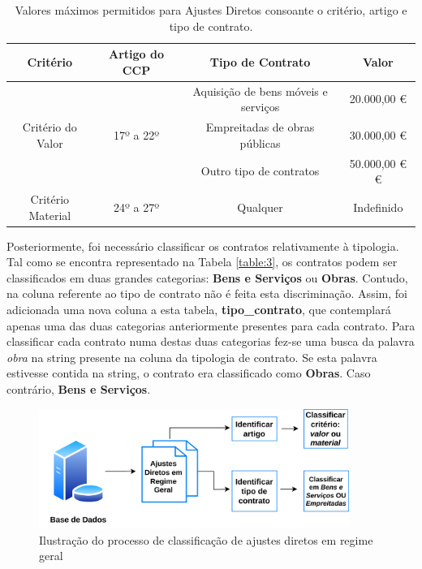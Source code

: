  \begin{table}[H]
 	\centering
 	\begin{tabular}{|c|c|c|c|}
 		\hline
 		\textbf{Critério}                  & \textbf{Artigo do CCP}           & \textbf{Tipo de Contrato}           & \textbf{Valor} \\ \hline
 		\multirow{3}{*}{Critério do Valor} & \multirow{3}{*}{17º a 22º} & Aquisição de bens móveis e serviços & 20.000,00 €         \\ \cline{3-4} 
 		&                            & Empreitadas de obras públicas       & 30.000,00 €        \\ \cline{3-4} 
 		&                            & Outro tipo de contratos             & 50.000,00 € €        \\ \hline
 		Critério Material                  & 24º a 27º                  & Qualquer                            & Indefinido     \\ \hline
 	\end{tabular}
 	\caption{Valores máximos permitidos para Ajustes Diretos consoante o critério, artigo e tipo de contrato.}
 \end{table}

Posteriormente, foi necessário classificar os contratos relativamente à tipologia. Tal como se encontra representado na Tabela \ref{table:3}, os contratos podem ser classificados em duas grandes categorias: \textbf{Bens e Serviços} ou \textbf{Obras}. Contudo, na coluna referente ao tipo de contrato não é feita esta discriminação. Assim, foi adicionada uma nova coluna a esta tabela, \textbf{tipo\_contrato}, que contemplará apenas uma das duas categorias anteriormente presentes para cada contrato. Para classificar cada contrato numa destas duas categorias fez-se uma busca da palavra \textit{obra} na string presente na coluna da tipologia de contrato. Se esta palavra estivesse contida na string, o contrato era classificado como \textbf{Obras}. Caso contrário, \textbf{Bens e Serviços}. 

\begin{figure}[H]
	\centering
	\includegraphics[width=0.9\textwidth]{imagens/rf1.png}
	\caption{Ilustração do processo de classificação de ajustes diretos em regime geral}
	\label{}
\end{figure}

